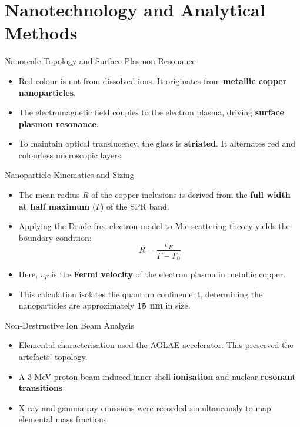 \documentclass[aspectratio=169]{beamer}
\begin{document}
\section{Nanotechnology and Analytical Methods}

\begin{frame}{Nanoscale Topology and Surface Plasmon Resonance}
  \begin{itemize}
    \item Red colour is not from dissolved ions. It originates from
      \textbf{metallic copper nanoparticles}.
    \item The electromagnetic field couples to the electron plasma, driving
      \textbf{surface plasmon resonance}.
    \item To maintain optical translucency, the glass is \textbf{striated}. It
      alternates red and colourless microscopic layers.
  \end{itemize}
\end{frame}

\begin{frame}{Nanoparticle Kinematics and Sizing}
  \begin{itemize}
    \item The mean radius $R$ of the copper inclusions is derived from the
      \textbf{full width at half maximum} ($\Gamma$) of the SPR band.
    \item Applying the Drude free-electron model to Mie scattering theory
      yields the boundary condition:
      \[ R = \frac{v_F}{\Gamma - \Gamma_0} \]
    \item Here, $v_F$ is the \textbf{Fermi velocity} of the electron plasma in
      metallic copper.
    \item This calculation isolates the quantum confinement, determining the
      nanoparticles are approximately \textbf{15 nm} in size.
  \end{itemize}
\end{frame}

\begin{frame}{Non-Destructive Ion Beam Analysis}
  \begin{itemize}
    \item Elemental characterisation used the AGLAE accelerator. This preserved
      the artefacts' topology.
    \item A 3 MeV proton beam induced inner-shell \textbf{ionisation} and
      nuclear \textbf{resonant transitions}.
    \item X-ray and gamma-ray emissions were recorded simultaneously to map
      elemental mass fractions.
  \end{itemize}
\end{frame}
\end{document}
